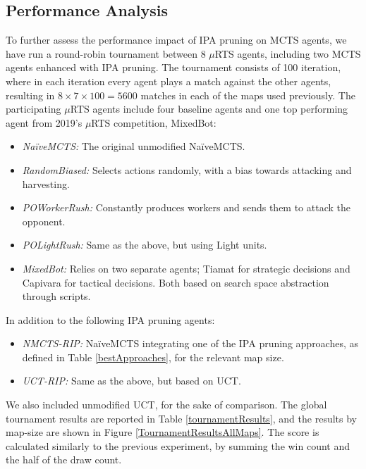 \documentclass[conference]{IEEEtran}
\newcommand{\mRTS}{$\mu$RTS}
\begin{document}

\subsection{Performance Analysis}

To further assess the performance impact of IPA pruning on MCTS agents, we have run a round-robin tournament between 8 \mRTS{} agents, including two MCTS agents enhanced with IPA pruning. The tournament consists of 100 iteration, where in each iteration every agent plays a match against the other agents, resulting in $8\times7\times100 = 5600$ matches in each of the maps used previously. The participating \mRTS{} agents include four baseline agents and one top performing agent from 2019's \mRTS{} competition, MixedBot:

\begin{itemize}
\item \textit{NaïveMCTS:} The original unmodified NaïveMCTS.
\item \textit{RandomBiased:} Selects actions randomly, with a bias towards attacking and harvesting.
\item \textit{POWorkerRush:} Constantly produces workers and sends them to attack the opponent.
\item \textit{POLightRush:} Same as the above, but using Light units.
\item \textit{MixedBot:} Relies on two separate agents; Tiamat\cite{marino_evolving_2018} for strategic decisions and Capivara\cite{moraes_action_2018} for tactical decisions. Both based on search space abstraction through scripts.
\end{itemize}

In addition to the following IPA pruning agents:

\begin{itemize}
\item \textit{NMCTS-RIP:} NaïveMCTS integrating one of the IPA pruning approaches, as defined in Table \ref{bestApproaches}, for the relevant map size.
\item \textit{UCT-RIP:} Same as the above, but based on UCT.
\end{itemize}

We also included unmodified UCT, for the sake of comparison. The global tournament results are reported in Table \ref{tournamentResults}, and the results by map-size are shown in Figure \ref{TournamentResultsAllMaps}. The score is calculated similarly to the previous experiment, by summing the win count and the half of the draw count.
\end{document}
